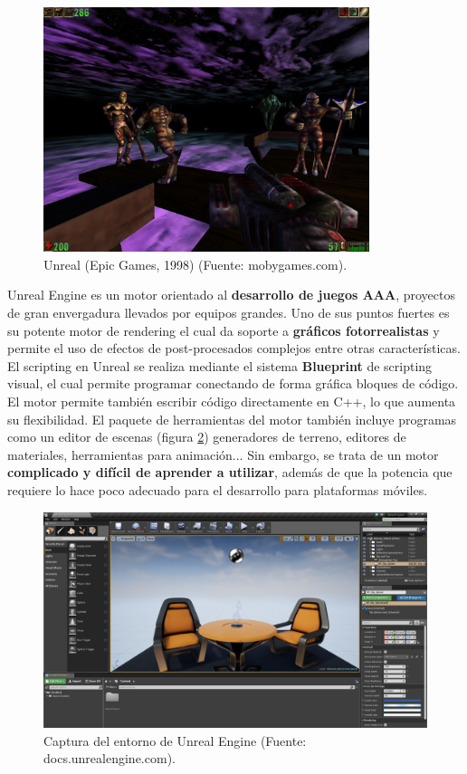 \begin{figure}[h]
	\includegraphics[width=0.85\textwidth]{images/estadodelarte/motores/unreal-original}
    \caption{Unreal (Epic Games, 1998) (Fuente: mobygames.com).}
	\centering
	\label{unreal-original}
\end{figure}

Unreal Engine es un motor orientado al \textbf{desarrollo de juegos AAA}, proyectos de gran envergadura llevados por equipos grandes. Uno de sus puntos fuertes es su potente motor de rendering el cual da soporte a \textbf{gráficos fotorrealistas} y permite el uso de efectos de post-procesados complejos entre otras características. El scripting en Unreal se realiza mediante el sistema \textbf{Blueprint} de scripting visual, el cual permite programar conectando de forma gráfica bloques de código. El motor permite también escribir código directamente en C++, lo que aumenta su flexibilidad. El paquete de herramientas del motor también incluye programas como un editor de escenas (figura \ref{captura-unreal}) generadores de terreno, editores de materiales, herramientas para animación... Sin embargo, se trata de un motor \textbf{complicado y difícil de aprender a utilizar}, además de que la potencia que requiere lo hace poco adecuado para el desarrollo para plataformas móviles.

\begin{figure}[h]
	\includegraphics[width=1\textwidth]{images/estadodelarte/motores/captura-unreal}
	\centering
	\caption{Captura del entorno de Unreal Engine (Fuente: docs.unrealengine.com).}
	\label{captura-unreal}
\end{figure}

